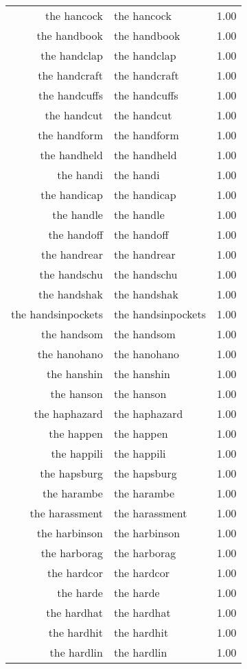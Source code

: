 \begin{table}[ht]
\begin{tabular}{rlr}
  the hancock & the hancock & 1.00 \\ 
  the handbook & the handbook & 1.00 \\ 
  the handclap & the handclap & 1.00 \\ 
  the handcraft & the handcraft & 1.00 \\ 
  the handcuffs & the handcuffs & 1.00 \\ 
  the handcut & the handcut & 1.00 \\ 
  the handform & the handform & 1.00 \\ 
  the handheld & the handheld & 1.00 \\ 
  the handi & the handi & 1.00 \\ 
  the handicap & the handicap & 1.00 \\ 
  the handle & the handle & 1.00 \\ 
  the handoff & the handoff & 1.00 \\ 
  the handrear & the handrear & 1.00 \\ 
  the handschu & the handschu & 1.00 \\ 
  the handshak & the handshak & 1.00 \\ 
  the handsinpockets & the handsinpockets & 1.00 \\ 
  the handsom & the handsom & 1.00 \\ 
  the hanohano & the hanohano & 1.00 \\ 
  the hanshin & the hanshin & 1.00 \\ 
  the hanson & the hanson & 1.00 \\ 
  the haphazard & the haphazard & 1.00 \\ 
  the happen & the happen & 1.00 \\ 
  the happili & the happili & 1.00 \\ 
  the hapsburg & the hapsburg & 1.00 \\ 
  the harambe & the harambe & 1.00 \\ 
  the harassment & the harassment & 1.00 \\ 
  the harbinson & the harbinson & 1.00 \\ 
  the harborag & the harborag & 1.00 \\ 
  the hardcor & the hardcor & 1.00 \\ 
  the harde & the harde & 1.00 \\ 
  the hardhat & the hardhat & 1.00 \\ 
  the hardhit & the hardhit & 1.00 \\ 
  the hardlin & the hardlin & 1.00 \\ 

\end{tabular}
\end{table}
